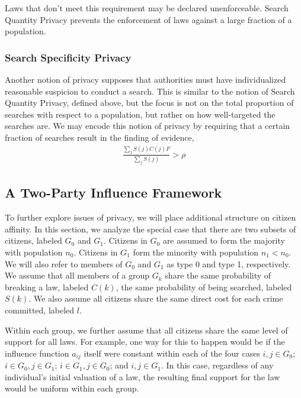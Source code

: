 Laws that don't meet this requirement may be declared unenforceable.  Search Quantity Privacy prevents the enforcement of laws against a large fraction of a population.


\subsubsection{Search Specificity Privacy}

Another notion of privacy supposes that authorities must have individualized reasonable suspicion to conduct a search.  This is similar to the notion of Search Quantity Privacy, defined above, but the focus is not on the total proportion of searches with respect to a population, but rather on how well-targeted the searches are.  We may encode this notion of privacy by requiring that a certain fraction of searches result in the finding of evidence,
\begin{align}
\frac{\sum_j S(j)C(j)F}{\sum_j S(j)} > \rho
\end{align}



\subsection{A Two-Party Influence Framework}

To further explore issues of privacy, we will place additional structure on citizen affinity.  In this section, we analyze the special case that there are two subsets of citizens, labeled $G_0$ and $G_1$.  Citizens in $G_0$ are assumed to form the majority with population $n_0$.  Citizens in $G_1$ form the minority with population $n_1 < n_0$.  We will also refer to members of $G_0$ and $G_1$ as type 0 and type 1, respectively.  We assume that all members of a group $G_k$ share the same probability of breaking a law, labeled $C(k)$, the same probability of being searched, labeled $S(k)$.  We also assume all citizens share the same direct cost for each crime committed, labeled $l$.

Within each group, we further assume that all citizens share the same level of support for all laws.  For example, one way for this to happen would be if the influence function $a_{ij}$ itself were constant within each of the four cases $i,j \in G_0$; $i \in G_0, j \in G_1$; $i \in G_1, j \in G_0$; and $i,j \in G_1$. In this case, regardless of any individual's initial valuation of a law, the resulting final support for the law would be uniform within each group.

